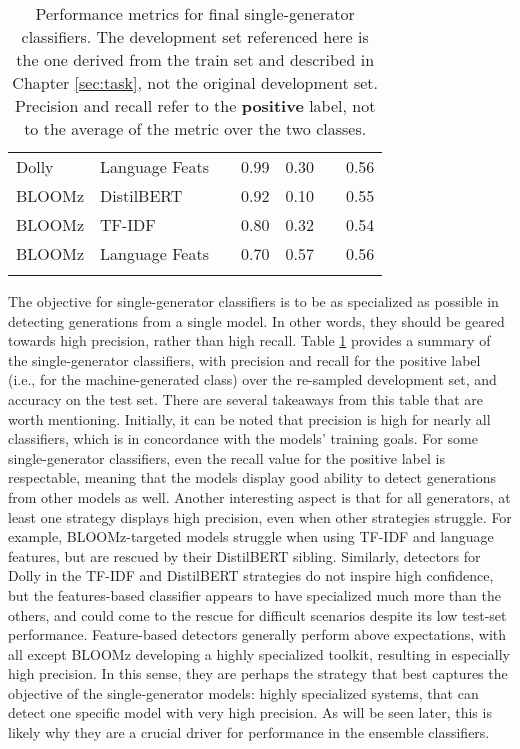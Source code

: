 \begin{table}[ht]
\begin{tabular}{llp{10px}ccp{10px}c}
        Dolly                  & Language Feats            &  & 0.99                                & 0.30          &          & 0.56            \\
        BLOOMz                 & DistilBERT                &  & 0.92                                & 0.10          &          & 0.55            \\
        BLOOMz                 & TF-IDF                    &  & 0.80                                & 0.32          &          & 0.54            \\
        BLOOMz                 & Language Feats            &  & 0.70                                & 0.57          &          & 0.56            \\
        \bottomrule
        \vspace{0.1cm}
    \end{tabular}
    \caption{
        Performance metrics for final single-generator classifiers.
        The development set referenced here is the one derived from the train set and described in Chapter \ref{sec:task}, not the original development set.
        Precision and recall refer to the \textbf{positive} label, not to the average of the metric over the two classes.
    }
    \label{tab:subsolutions-final}
\end{table}

The objective for single-generator classifiers is to be as specialized as possible in detecting generations from a single model.
In other words, they should be geared towards high precision, rather than high recall.
Table \ref{tab:subsolutions-final} provides a summary of the single-generator classifiers, with precision and recall for the positive label (i.e., for the machine-generated class) over the re-sampled development set, and accuracy on the test set.
There are several takeaways from this table that are worth mentioning.
Initially, it can be noted that precision is high for nearly all classifiers, which is in concordance with the models' training goals.
For some single-generator classifiers, even the recall value for the positive label is respectable, meaning that the models display good ability to detect generations from other models as well.
Another interesting aspect is that for all generators, at least one strategy displays high precision, even when other strategies struggle.
For example, BLOOMz-targeted models struggle when using TF-IDF and language features, but are rescued by their DistilBERT sibling.
Similarly, detectors for Dolly in the TF-IDF and DistilBERT strategies do not inspire high confidence, but the features-based classifier appears to have specialized much more than the others, and could come to the rescue for difficult scenarios despite its low test-set performance.
Feature-based detectors generally perform above expectations, with all except BLOOMz developing a highly specialized toolkit, resulting in especially high precision.
In this sense, they are perhaps the strategy that best captures the objective of the single-generator models: highly specialized systems, that can detect one specific model with very high precision.
As will be seen later, this is likely why they are a crucial driver for performance in the ensemble classifiers.

